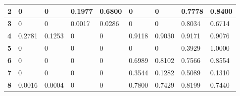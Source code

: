 \begin{table}[H]
\begin{tabular}{|l|ll|ll|ll|ll|}
\textbf{2}     & \multicolumn{1}{l|}{0}                              & 0                           & \multicolumn{1}{l|}{0.1977}                          & 0.6800                       & \multicolumn{1}{l|}{0}                            & 0                        & \multicolumn{1}{l|}{0.7778}                                & 0.8400                             \\ \hline
\textbf{3}     & \multicolumn{1}{l|}{0}                              & 0                           & \multicolumn{1}{l|}{0.0017}                          & 0.0286                       & \multicolumn{1}{l|}{0}                            & 0                        & \multicolumn{1}{l|}{0.8034}                                & 0.6714                             \\ \hline
\textbf{4}     & \multicolumn{1}{l|}{0.2781}                              & 0.1253                           & \multicolumn{1}{l|}{0}                          & 0                       & \multicolumn{1}{l|}{0.9118}                            & 0.9030                        & \multicolumn{1}{l|}{0.9171}                                & 0.9076                             \\ \hline
\textbf{5}     & \multicolumn{1}{l|}{0}                              & 0                           & \multicolumn{1}{l|}{0}                          & 0                       & \multicolumn{1}{l|}{0}                            & 0                        & \multicolumn{1}{l|}{0.3929}                                & 1.0000                             \\ \hline
\textbf{6}     & \multicolumn{1}{l|}{0}                              & 0                           & \multicolumn{1}{l|}{0}                          & 0                       & \multicolumn{1}{l|}{0.6989}                            & 0.8102                        & \multicolumn{1}{l|}{0.7566}                                & 0.8554                             \\ \hline
\textbf{7}     & \multicolumn{1}{l|}{0}                              & 0                           & \multicolumn{1}{l|}{0}                          & 0                       & \multicolumn{1}{l|}{0.3544}                            & 0.1282                        & \multicolumn{1}{l|}{0.5089}                                & 0.1310                             \\ \hline
\textbf{8}     & \multicolumn{1}{l|}{0.0016}                              & 0.0004                           & \multicolumn{1}{l|}{0}                          & 0                       & \multicolumn{1}{l|}{0.7800}                            & 0.7429                        & \multicolumn{1}{l|}{0.8199}                                & 0.7440                             \\ \hline

\end{tabular}
\end{table}
